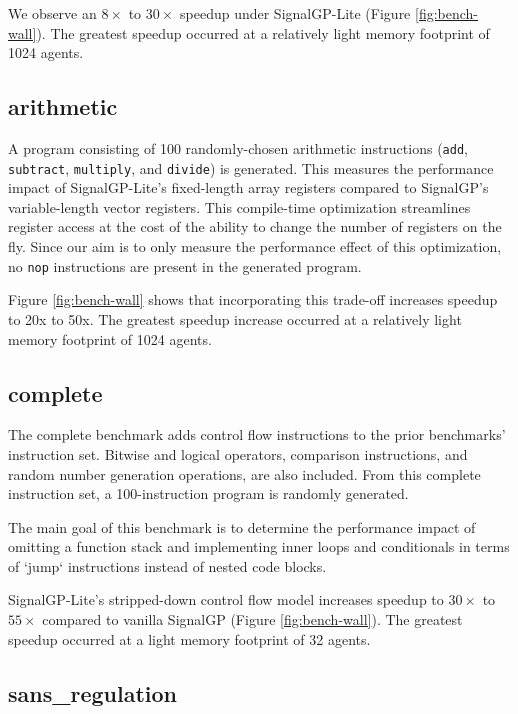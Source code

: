 We observe an $8\times$ to $30\times$ speedup under SignalGP-Lite (Figure \ref{fig:bench-wall}).
The greatest speedup occurred at a relatively light memory footprint of 1024 agents.

\subsection{arithmetic}

A program consisting of 100 randomly-chosen arithmetic instructions (\texttt{add}, \texttt{subtract}, \texttt{multiply}, and \texttt{divide}) is generated.
This measures the performance impact of SignalGP-Lite's fixed-length array registers compared to SignalGP's variable-length vector registers.
This compile-time optimization streamlines register access at the cost of the ability to change the number of registers on the fly.
Since our aim is to only measure the performance effect of this optimization, no \texttt{nop} instructions are present in the generated program.

Figure \ref{fig:bench-wall} shows that incorporating this trade-off increases speedup to 20x to 50x.
The greatest speedup increase occurred at a relatively light memory footprint of 1024 agents.

\subsection{complete}

The complete benchmark adds control flow instructions to the prior benchmarks' instruction set.
Bitwise and logical operators, comparison instructions, and random number generation operations, are also included.
From this complete instruction set, a 100-instruction program is randomly generated.

The main goal of this benchmark is to determine the performance impact of omitting a function stack and implementing inner loops and conditionals in terms of `jump` instructions instead of nested code blocks.

SignalGP-Lite's stripped-down control flow model increases speedup to $30\times$ to $55\times$ compared to vanilla SignalGP (Figure \ref{fig:bench-wall}).
The greatest speedup occurred at a light memory footprint of 32 agents.

\subsection{sans\_regulation}


